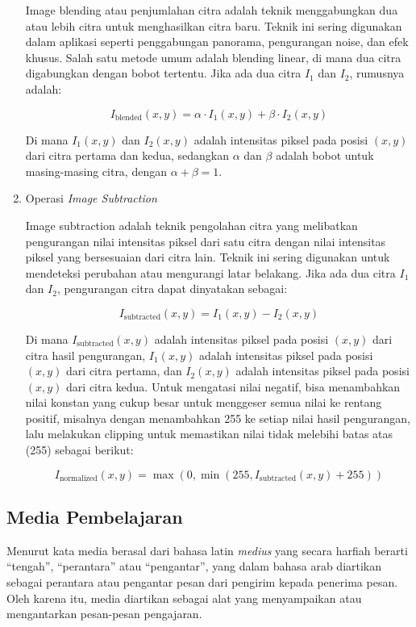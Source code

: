 \begin{enumerate}[leftmargin=1cm, itemindent=0.6cm,labelwidth=15pt, labelsep=5pt, listparindent=1cm,align=left]
Image blending atau penjumlahan citra adalah teknik menggabungkan dua atau lebih citra untuk menghasilkan citra baru. Teknik ini sering digunakan dalam aplikasi seperti penggabungan panorama, pengurangan noise, dan efek khusus. Salah satu metode umum adalah blending linear, di mana dua citra digabungkan dengan bobot tertentu. Jika ada dua citra \(I_1\) dan \(I_2\), rumusnya adalah:

\begin{equation}
I_{\text{blended}}(x, y) = \alpha \cdot I_1(x, y) + \beta \cdot I_2(x, y)
\end{equation}

Di mana \(I_1(x, y)\) dan \(I_2(x, y)\) adalah intensitas piksel pada posisi \((x,y)\) dari citra pertama dan kedua, sedangkan \(\alpha\) dan \(\beta\) adalah bobot untuk masing-masing citra, dengan \(\alpha + \beta = 1\).

\item Operasi \textit{Image Subtraction}

Image subtraction adalah teknik pengolahan citra yang melibatkan pengurangan nilai intensitas piksel dari satu citra dengan nilai intensitas piksel yang bersesuaian dari citra lain. Teknik ini sering digunakan untuk mendeteksi perubahan atau mengurangi latar belakang. Jika ada dua citra \(I_1\) dan \(I_2\), pengurangan citra dapat dinyatakan sebagai:

\begin{equation}
I_{\text{subtracted}}(x, y) = I_1(x, y) - I_2(x, y)
\end{equation}

Di mana \(I_{\text{subtracted}}(x, y)\) adalah intensitas piksel pada posisi \((x,y)\) dari citra hasil pengurangan, \(I_1(x, y)\) adalah intensitas piksel pada posisi \((x,y)\) dari citra pertama, dan \(I_2(x, y)\) adalah intensitas piksel pada posisi \((x,y)\) dari citra kedua. Untuk mengatasi nilai negatif, bisa menambahkan nilai konstan yang cukup besar untuk menggeser semua nilai ke rentang positif, misalnya dengan menambahkan 255 ke setiap nilai hasil pengurangan, lalu melakukan clipping untuk memastikan nilai tidak melebihi batas atas (255) sebagai berikut:

\begin{equation}
I_{\text{normalized}}(x, y) = \max(0, \min(255, I_{\text{subtracted}}(x, y) + 255))
\end{equation}


\end{enumerate}
\subsection{Media Pembelajaran}
Menurut \textcite{arsyad2015media} kata media berasal dari bahasa latin \textit{medius} yang secara harfiah berarti ``tengah'', ``perantara'' atau ``pengantar'', yang dalam bahasa arab diartikan sebagai perantara atau pengantar pesan dari pengirim kepada penerima pesan. Oleh karena itu, media diartikan sebagai alat yang menyampaikan atau mengantarkan pesan-pesan pengajaran.

